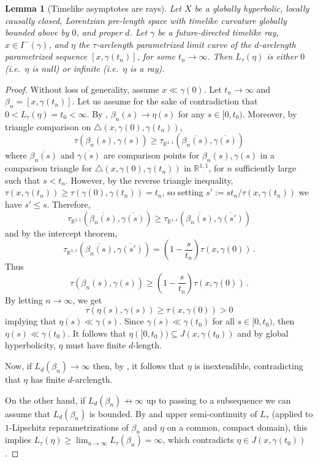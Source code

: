 \documentclass[11pt,reqno]{amsart}
\theoremstyle{definition}
\newcommand{\Cref}[1]{\zcref[S]{#1}}
\theoremstyle{definition}
\theoremstyle{plain}
\newtheorem{lem}[dfn]{Lemma}
\theoremstyle{remark}
\newcommand{\LpLS}{Lorentzian pre-length space }
\begin{document}
\begin{lem}[Timelike asymptotes are rays]\label{lem:tl_asy_are_rays}
Let $X$ be a globally hyperbolic, locally causally closed, \LpLS with timelike curvature globally bounded above by $0$, and proper $d$. 
Let $\gamma$ be a future-directed timelike ray, $x\in I^-(\gamma)$, and $\eta$ the $\tau$-arclength parametrized limit curve of the $d$-arclength parametrized sequence $[x,\gamma(t_n)]$, for some $t_n\to \infty$. Then $L_\tau(\eta)$ is either $0$ (i.e.\ $\eta$ is null) or infinite (i.e.\ $\eta$ is a ray). 
\end{lem}
\begin{proof}
Without loss of generality, assume $x\ll\gamma(0)$. Let $t_n\to \infty$ and $\beta_n = [x,\gamma(t_n)]$. Let us assume for the sake of contradiction that $0<L_\tau(\eta) = t_0 <\infty$. By \Cref{lem:conv_d_vs_tau},  $\beta_n(s)\to \eta(s)$ for any $s\in [0,t_0)$. Moreover, by triangle comparison on $\triangle(x,\gamma(0),\gamma(t_n))$, 
\[
\tau(\beta_n(s), \gamma(s)) \geq \tau_{\mathbb{R}^{1,1}}\left(\overline{\beta_n(s)},\overline{\gamma(s)}\right)
\]
where $\overline{\beta_n(s)}$ and $\overline{\gamma(s)}$ are comparison points for $\beta_n(s), \gamma(s)$ in a comparison triangle for $\triangle(x,\gamma(0),\gamma(t_n))$ in $\mathbb{R}^{1,1}$, for $n$ sufficiently large such that $s<t_n$. However, by the reverse triangle inequality, $\tau(x,\gamma(t_n)) \geq \tau(\gamma(0),\gamma(t_n)) = t_n$, so setting $s':= s t_n/\tau(x,\gamma(t_n))$ we have $s' \leq s$. Therefore,
\[
\tau_{\mathbb{R}^{1,1}}\left(\overline{\beta_n(s)},\overline{\gamma(s)}\right) \geq \tau_{\mathbb{R}^{1,1}}\left(\overline{\beta_n(s)},\overline{\gamma(s')}\right)
\]
and by the intercept theorem,
\[
\tau_{\mathbb{R}^{1,1}}\left(\overline{\beta_n(s)},\overline{\gamma(s')}\right) = \left(1 - \frac{s}{t_n}\right)\tau(x,\gamma(0)) \, .
\]
Thus 
\[
\tau(\beta_n(s), \gamma(s)) \geq  \left(1 - \frac{s}{t_n}\right)\tau(x,\gamma(0)) \, .
\]
By letting $n\to \infty$, we get
\[
\tau(\eta(s), \gamma(s)) \geq \tau(x,\gamma(0)) > 0
\]
implying that $\eta(s) \ll \gamma(s)$. Since $\gamma(s) \ll \gamma(t_0)$ for all $s\in [0,t_0)$, then $\eta(s) \ll \gamma(t_0)$. It follows that $\eta([0,t_0))\subseteq J(x,\gamma(t_0))$ and by global hyperbolicity, $\eta$ must have finite $d$-length. 

Now, if $L_d(\beta_n)\to \infty$ then, by \cite[Theorem~3.14]{kunzinger-saemann2018}, it follows that $\eta$ is inextendible, contradicting that $\eta$ has finite $d$-arclength.

On the other hand, if $L_d(\beta_n) \not\to \infty$ up to passing to a subsequence we can assume that $L_d(\beta_n)$ is bounded. By \cite[Theorem~3.7]{kunzinger-saemann2018} and upper semi-continuity of $L_\tau$ (applied to $1$-Lipschitz reparametrizations of $\beta_n$ and $\eta$ on a common, compact domain), this implies $L_\tau(\eta) \geq \lim_{n\to\infty} L_\tau(\beta_n) = \infty$, which contradicts $\eta\in J(x,\gamma(t_0))$.
\end{proof}
\end{document}
